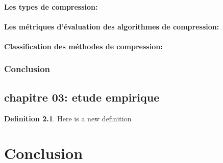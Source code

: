 \documentclass[11pt,a4paper]{report}
\theoremstyle{definition}
\newtheorem{defn}{Definition}[section]
\begin{document}
			\subsection{Les types de compression:}
			
			
	
			\subsection{Les métriques d'évaluation des algorithmes de compression:}
				
			
			\subsection{Classification des méthodes de compression:}
			
		\section{Conclusion}


	\chapter{chapitre 03: etude empirique}
	
	\begin{defn}
			Here is a new definition
	\end{defn}
	

\part{Conclusion} 




\newpage


\end{document}
